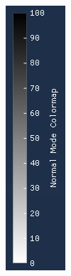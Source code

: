 \documentclass[times, utf8, diplomski]{fer}
\begin{document}
\begin{figure} [H]
     \centering
     \begin{subfigure}[h]{0.16\textwidth}
         \centering
         \includegraphics[width=\textwidth]{linear_colormap.png}

\end{subfigure}
\end{figure}
\end{document}
